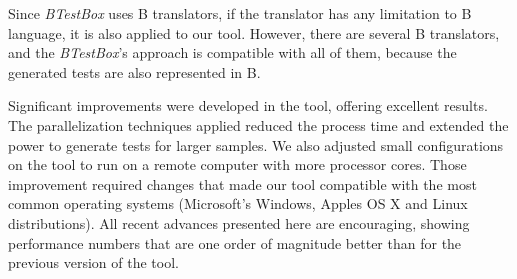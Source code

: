\documentclass[runningheads]{llncs}
\begin{document}


Since  \textit{BTestBox} uses B translators, if the translator has any limitation to B language, it is also applied to our tool. However, there are several B translators, and the  \textit{BTestBox}'s approach is compatible with all of them, because the generated tests are also represented in B. 

Significant improvements were developed in the tool, offering excellent results.
The parallelization techniques applied reduced the process time and extended the power to generate tests for larger samples. We also adjusted small configurations on the tool to run on a remote computer with more processor cores. Those improvement required changes that made our tool compatible with the most common operating systems (Microsoft’s Windows, Apple\textquotesingle s OS X and Linux distributions). All recent advances presented here are encouraging, showing performance numbers that are one order of magnitude better than for the previous version of the tool.





%
%
%




 
\end{document}

